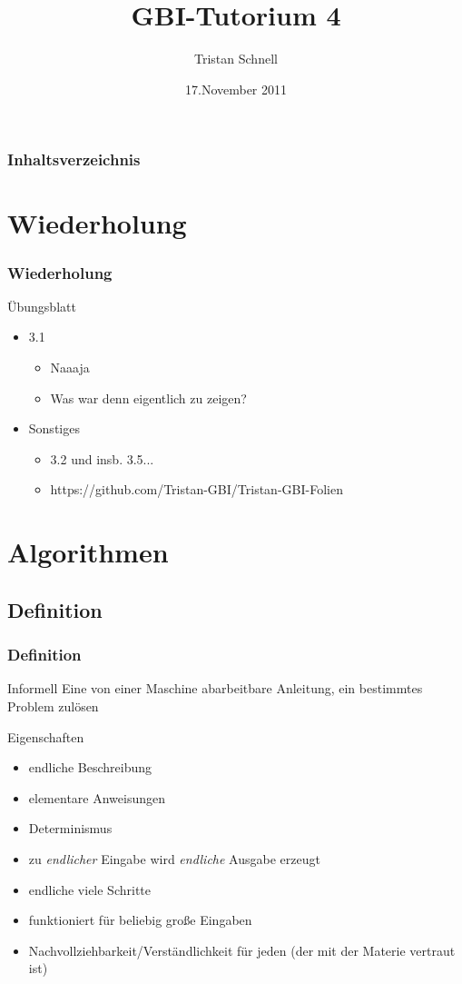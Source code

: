 \documentclass{beamer}
\author{Tristan Schnell}
\title{GBI-Tutorium 4}
\date{17.November 2011}
\begin{document}
\begin {frame}
	\titlepage
\end {frame}

\begin {frame}
	\frametitle {Inhaltsverzeichnis}
	\tableofcontents
\end {frame}

\section{Wiederholung}

\begin{frame}
	\frametitle{Wiederholung}
	\begin{block}{Übungsblatt}
		\begin{itemize}
			\item 3.1
				\begin{itemize}
					\item Naaaja
					\item Was war denn eigentlich zu zeigen?
				\end{itemize}
			\item Sonstiges
				\begin{itemize}
					\item 3.2 und insb. 3.5...
					\item https://github.com/Tristan-GBI/Tristan-GBI-Folien
				\end{itemize}
		\end{itemize}
	\end{block}
\end{frame}

\section{Algorithmen}
\subsection{Definition}

\begin{frame}
	\frametitle{Definition}
	\begin{block}{Informell}
		Eine von einer Maschine abarbeitbare Anleitung, ein
		bestimmtes Problem zulösen
	\end{block}
	\begin{block}{Eigenschaften}
		\pause
		\begin{itemize}
 			 \item endliche Beschreibung
 			 \item elementare Anweisungen
 			 \item Determinismus
 			 \item zu \emph{endlicher} Eingabe wird \emph{endliche} Ausgabe erzeugt
 			 \item endliche viele Schritte
 			 \item funktioniert für beliebig große Eingaben
			  \item Nachvollziehbarkeit/Verständlichkeit für jeden (der mit der Materie
 			 vertraut ist)
		\end{itemize}
	\end{block}
\end{frame}
\end{document}

